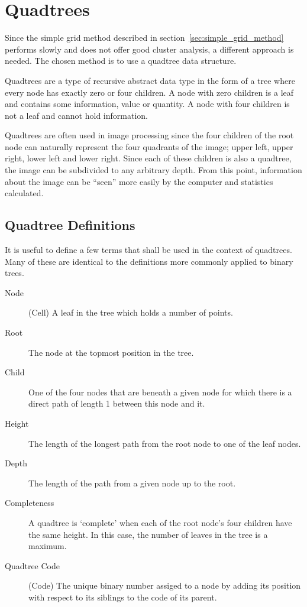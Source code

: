 
\section{Quadtrees}
\label{sec:quadtrees}

Since the simple grid method described in section~\ref{sec:simple_grid_method}
performs slowly and does not offer good cluster analysis, a different approach
is needed. The chosen method is to use a quadtree data structure.

Quadtrees are a type of recursive abstract data type in the form of a tree
where every node has exactly zero or four children. A node with zero children
is a leaf and contains some information, value or quantity. A node with four
children is not a leaf and cannot hold information.

Quadtrees are often used in image processing since the four children of the
root node can naturally represent the four quadrants of the image; upper left,
upper right, lower left and lower right. Since each of these children is also a
quadtree, the image can be subdivided to any arbitrary depth. From this point,
information about the image can be ``seen'' more easily by the computer and
statistics calculated.

\subsection{Quadtree Definitions}
\label{sub:quadtree_definitions}

It is useful to define a few terms that shall be used in the context of
quadtrees. Many of these are identical to the definitions more commonly applied
to binary trees.

\begin{description}
	\item[Node] (Cell) A leaf in the tree which holds a number of points.
	\item[Root] The node at the topmost position in the tree.
	\item[Child] One of the four nodes that are beneath a given node for which
		there is a direct path of length 1 between this node and it.
	\item[Height] The length of the longest path from the root node to one of
		the leaf nodes.
	\item[Depth] The length of the path from a given node up to the root.
	\item[Completeness] A quadtree is `complete' when each of the root node's
		four children have the same height. In this case, the number of leaves
		in the tree is a maximum.
	\item[Quadtree Code] (Code) The unique binary number assiged to a node by
		adding its position with respect to its siblings to the code of its
		parent.
\end{description}

